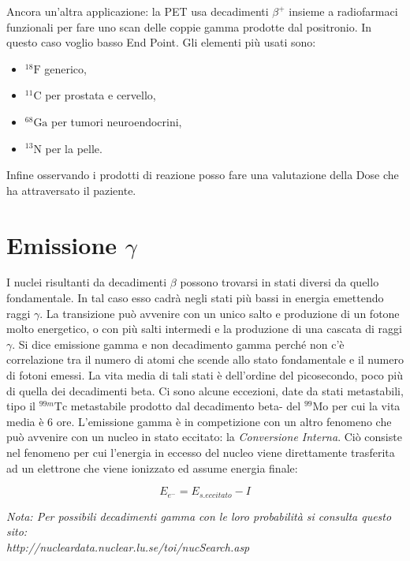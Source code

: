 Ancora un'altra applicazione: la PET usa decadimenti $\beta^+$ insieme a radiofarmaci funzionali per fare uno scan delle coppie gamma prodotte dal positronio. In questo caso voglio basso End Point. Gli elementi più usati sono:

\begin{itemize}
\item $^{18}\text{F}$ generico,
\item $^{11}\text{C}$ per prostata e cervello,
\item $^{68}\text{Ga}$ per tumori neuroendocrini,
\item $^{13}\text{N}$ per la pelle.
\end{itemize}

Infine osservando i prodotti di reazione posso fare una valutazione della Dose che ha attraversato il paziente.

\section{Emissione $\gamma$}

I nuclei risultanti da decadimenti $\beta$ possono trovarsi in stati diversi da quello fondamentale. In tal caso esso cadrà negli stati più bassi in energia emettendo raggi $\gamma$. La transizione può avvenire con un unico salto e produzione di un fotone molto energetico, o con più salti intermedi e la produzione di una cascata di raggi $\gamma$. Si dice emissione gamma e non decadimento gamma perché non c'è correlazione tra il numero di atomi che scende allo stato fondamentale e il numero di fotoni emessi. La vita media di tali stati è dell'ordine del picosecondo, poco più di quella dei decadimenti beta. Ci sono alcune eccezioni, date da stati metastabili, tipo il $^{99m}\text{Tc}$ metastabile prodotto dal decadimento beta- del $^{99}\text{Mo}$ per cui la vita media è 6 ore.
L'emissione gamma è in competizione con un altro fenomeno che può avvenire con un nucleo in stato eccitato: la \emph{Conversione Interna}. Ciò consiste nel fenomeno per cui l'energia in eccesso del nucleo viene direttamente trasferita ad un elettrone che viene ionizzato ed assume energia finale:

\begin{equation}
E_{e^-}=E_{s.eccitato}-I
\end{equation}

\emph{Nota: Per possibili decadimenti gamma con le loro probabilità si consulta questo sito: \\http://nucleardata.nuclear.lu.se/toi/nucSearch.asp }\\

